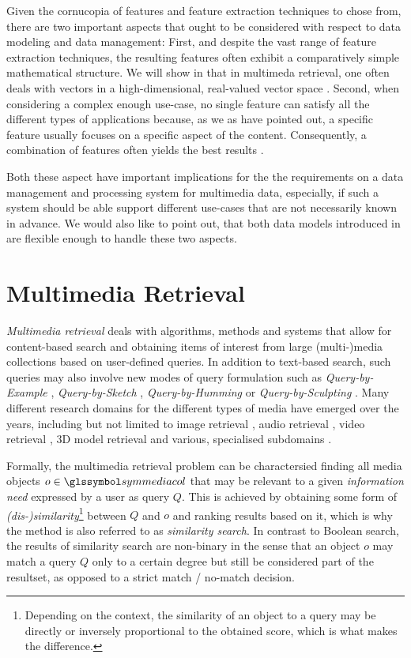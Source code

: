 Given the cornucopia of features and feature extraction techniques to chose from, there are two important aspects that ought to be considered with respect to data modeling and data management: First, and despite the vast range of feature extraction techniques, the resulting features often exhibit a comparatively simple mathematical structure. We will show in  that in multimeda retrieval, one often deals with vectors in a high-dimensional, real-valued vector space \cite{Zezula:2006Similarity}. Second, when considering a complex enough use-case, no single feature can satisfy all the different types of applications because, as we as have pointed out, a specific feature usually focuses on a specific aspect of the content. Consequently, a combination of features often yields the best results \cite{Deselaers:2008Features}.

Both these aspect have important implications for the the requirements on a data management and processing system for multimedia data, especially, if such a system should be able support different use-cases that are not necessarily known in advance. We would also like to point out, that both data models introduced in  are flexible enough to handle these two aspects.

\section{Multimedia Retrieval}
\label{section:multimedia_retrieval}

\emph{Multimedia retrieval} deals with algorithms, methods and systems that allow for content-based search and obtaining items of interest from large (multi-)media collections based on user-defined queries. In addition to text-based search, such queries may also involve new modes of query formulation such as \emph{Query-by-Example} \cite{Kelly:1995Query}, \emph{Query-by-Sketch} \cite{Cao:2010mind}, \emph{Query-by-Humming} \cite{Ghias:1995query} or \emph{Query-by-Sculpting} \cite{Boerlin:20203d}. Many different research domains for the different types of media have emerged over the years, including but not limited to image retrieval \cite{Dharani:2013Survey}, audio retrieval \cite{Lu:2001Indexing}, video retrieval \cite{Hu:2011Survey}, 3D model retrieval \cite{Yang:2007Content} and various, specialised subdomains \cite{Murthy:2018Content}.

Formally, the multimedia retrieval problem can be charactersied finding all media objects $o \in \symmediacol$ that may be relevant to a given \emph{information need} expressed by a user as query $Q$. This is achieved by obtaining some form of \emph{(dis-)similarity}\footnote{Depending on the context, the similarity of an object to a query may be directly or inversely proportional to the obtained score, which is what makes the difference.} between $Q$ and $o$ and ranking results based on it, which is why the method is also referred to as \emph{similarity search}. In contrast to Boolean search, the results of similarity search are non-binary in the sense that an object $o$ may match a query $Q$ only to a certain degree but still be considered part of the resultset, as opposed to a strict match / no-match decision.

